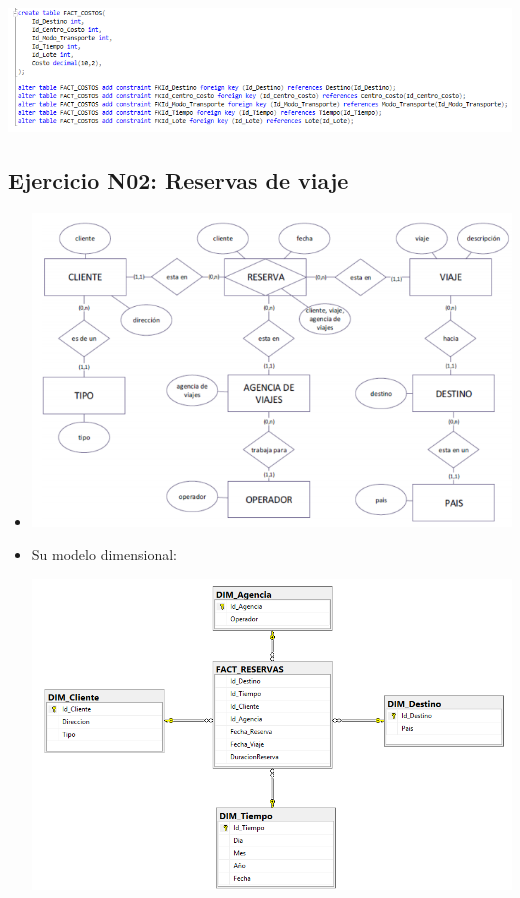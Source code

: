 \documentclass[12pt,letterpaper]{article}
\begin{document}
\begin{itemize}
\begin{center}
	\includegraphics[width=14cm]{./Imagenes/s1-2}
	\end{center}

\end{itemize}

\subsection{ Ejercicio N02: Reservas de viaje}
\begin{itemize}
\item  
	\begin{center}
	\includegraphics[width=14cm]{./Imagenes/e2}
	\end{center}
	\item Su modelo dimensional:
	\begin{center}
	\includegraphics[width=14cm]{./Imagenes/d2}

\end{center}
\end{itemize}
\end{document}
